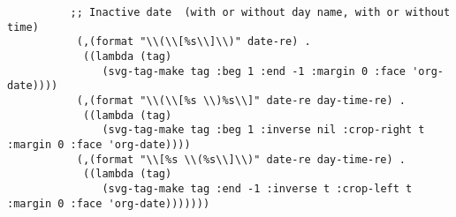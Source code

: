 \documentclass[11pt]{article}
\begin{document}
\begin{verbatim}
          ;; Inactive date  (with or without day name, with or without time)
           (,(format "\\(\\[%s\\]\\)" date-re) .
            ((lambda (tag)
               (svg-tag-make tag :beg 1 :end -1 :margin 0 :face 'org-date))))
           (,(format "\\(\\[%s \\)%s\\]" date-re day-time-re) .
            ((lambda (tag)
               (svg-tag-make tag :beg 1 :inverse nil :crop-right t :margin 0 :face 'org-date))))
           (,(format "\\[%s \\(%s\\]\\)" date-re day-time-re) .
            ((lambda (tag)
               (svg-tag-make tag :end -1 :inverse t :crop-left t :margin 0 :face 'org-date)))))))

\end{verbatim}
\end{document}
